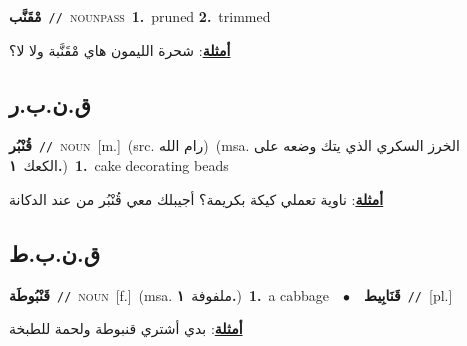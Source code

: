 \documentclass[10pt,a4paper,twoside]{article} %
\begin{document}
\begin{multicols}{2}
{\setlength\topsep{0pt}\textbf{\foreignlanguage{arabic}{مْقَنَّب}}\ {\color{gray}\texttt{//}\color{black}}\ \textsc{noun\textunderscore pass}\ \textbf{1.}~pruned  \textbf{2.}~trimmed\  \begin{flushright}\color{gray}\foreignlanguage{arabic}{\textbf{\underline{\foreignlanguage{arabic}{أمثلة}}}: شحرة الليمون هاي مْقَنَّبة ولا لا؟}\end{flushright}\color{black}} \vspace{2mm}

\vspace{-3mm}
\subsection*{\color{blue}\foreignlanguage{arabic}{ق.ن.ب.ر}\color{blue}{}} 

{\setlength\topsep{0pt}\textbf{\foreignlanguage{arabic}{قُنْبُر}}\ {\color{gray}\texttt{//}\color{black}}\ \textsc{noun}\ [m.]\ (src. \color{gray}\foreignlanguage{arabic}{رام الله}\color{black})\ \color{gray}(msa. \foreignlanguage{arabic}{الخرز السكري الذي يتك وضعه على الكعك}~\foreignlanguage{arabic}{\textbf{١.}})\color{black}\ \textbf{1.}~cake decorating beads\  \begin{flushright}\color{gray}\foreignlanguage{arabic}{\textbf{\underline{\foreignlanguage{arabic}{أمثلة}}}: ناوية تعملي كيكة بكريمة؟ أجيبلك معي قُنْبُر من عند الدكانة}\end{flushright}\color{black}} \vspace{2mm}

\vspace{-3mm}
\subsection*{\color{blue}\foreignlanguage{arabic}{ق.ن.ب.ط}\color{blue}{}} 

{\setlength\topsep{0pt}\textbf{\foreignlanguage{arabic}{قَنْبُوطَة}}\ {\color{gray}\texttt{//}\color{black}}\ \textsc{noun}\ [f.]\ \color{gray}(msa. \foreignlanguage{arabic}{ملفوفة}~\foreignlanguage{arabic}{\textbf{١.}})\color{black}\ \textbf{1.}~a cabbage\ \ $\bullet$\ \ \setlength\topsep{0pt}\textbf{\foreignlanguage{arabic}{قَنَابِيط}}\ {\color{gray}\texttt{//}\color{black}}\ [pl.]\  \begin{flushright}\color{gray}\foreignlanguage{arabic}{\textbf{\underline{\foreignlanguage{arabic}{أمثلة}}}: بدي أشتري قنبوطة ولحمة للطبخة}\end{flushright}\color{black}} \vspace{2mm}


\end{multicols}
\end{document}
